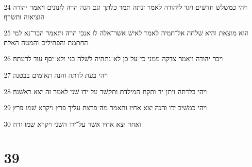 \par 24 ויהי כמשׁלשׁ חדשׁים ויגד ליהודה לאמר זנתה תמר כלתך וגם הנה הרה לזנונים ויאמר יהודה הוציאוה ותשׂרף׃
\par 25 הוא מוצאת והיא שׁלחה אל־חמיה לאמר לאישׁ אשׁר־אלה לו אנכי הרה ותאמר הכר־נא למי החתמת והפתילים והמטה האלה׃
\par 26 ויכר יהודה ויאמר צדקה ממני כי־על־כן לא־נתתיה לשׁלה בני ולא־יסף עוד לדעתה׃
\par 27 ויהי בעת לדתה והנה תאומים בבטנה׃
\par 28 ויהי בלדתה ויתן־יד ותקח המילדת ותקשׁר על־ידו שׁני לאמר זה יצא ראשׁנה׃
\par 29 ויהי כמשׁיב ידו והנה יצא אחיו ותאמר מה־פרצת עליך פרץ ויקרא שׁמו פרץ׃
\par 30 ואחר יצא אחיו אשׁר על־ידו השׁני ויקרא שׁמו זרח׃

\chapter{39}

